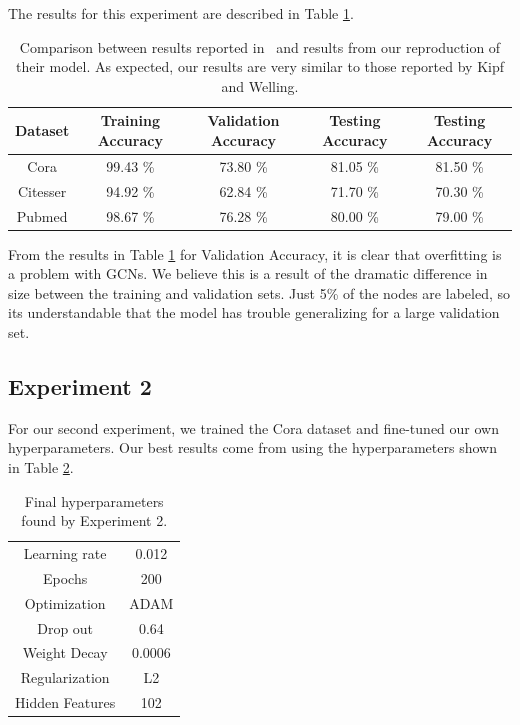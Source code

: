  The results for this experiment are described in Table \ref{tab:results1}.

\begin {table}[ht!]
  \begin{center}
    \begin{tabular}{|c|c|c|c|c|}
    \hline
    Dataset    &  Training Accuracy & Validation Accuracy & Testing Accuracy & \cite{Kipf2016} Testing Accuracy \\ \hline
    Cora          & 99.43 \% & 73.80 \%  & 81.05 \% & 81.50 \% \\ 
    Citesser      & 94.92 \% & 62.84 \%  & 71.70 \% & 70.30 \% \\
    Pubmed        & 98.67 \% & 76.28 \%  & 80.00 \% & 79.00 \% \\
    \hline
    \end{tabular}
  \end{center}
\caption {Comparison between results reported in~\cite{Kipf2016} and results from our reproduction of their model. As expected, our results are very similar to those reported by Kipf and Welling.} \label{tab:results1} 
\end{table}

From the results in Table \ref{tab:results1} for Validation Accuracy, it is clear that overfitting is a problem with GCNs. We believe this is a result of the dramatic difference in size between the training and validation sets. Just 5\% of the nodes are labeled, so its understandable that the model has trouble generalizing for a large validation set. 

\subsection{Experiment 2}
For our second experiment, we trained the Cora dataset and fine-tuned our own hyperparameters. Our best results come from using the hyperparameters shown in Table \ref{tab:hyperparameters2}.

\begin {table}[ht!]
  \begin{center}
    \begin{tabular}{|c|c|}
    \hline
    Learning rate     & 0.012 \\ 
    Epochs            & 200  \\ 
    Optimization      & ADAM \\
    Drop out          & 0.64   \\
    Weight Decay      & 0.0006 \\
    Regularization    & L2    \\
    Hidden Features   & 102   \\
    \hline
    \end{tabular}
  \end{center}
\caption {Final hyperparameters found by Experiment 2.} \label{tab:hyperparameters2} 
\end{table}

